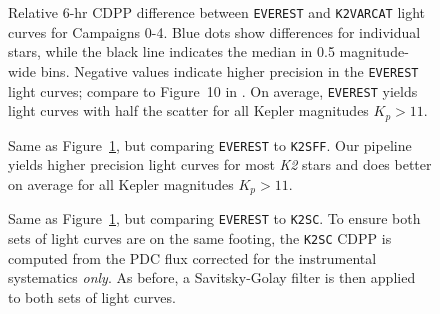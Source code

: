 \documentclass[]{emulateapj}
\begin{document}
\begin{figure}[h]
  \begin{center}
       \caption{Relative 6-hr CDPP difference between \texttt{EVEREST}
                and \texttt{K2VARCAT} light curves for Campaigns 0-4. Blue dots
                show differences for individual stars, while the black line
                indicates the median in 0.5 magnitude-wide bins. Negative
                values indicate higher precision in the \texttt{EVEREST}
                light curves; compare to Figure~10 in \cite{AIG16}. On average, \texttt{EVEREST} yields
                light curves with half the scatter for all Kepler magnitudes $K_p > 11$.}
     \label{fig:comparison_k2varcat}
  \end{center}
\end{figure}
\begin{figure}[h]
  \begin{center}
       \caption{Same as Figure~\ref{fig:comparison_k2varcat}, but comparing 
                \texttt{EVEREST} to \texttt{K2SFF}. Our pipeline yields higher
                precision light curves for most \emph{K2} stars and does
                better on average for all Kepler magnitudes $K_p > 11$.}
     \label{fig:comparison_k2sff}
  \end{center}
\end{figure}
\begin{figure}[h]
  \begin{center}
       \caption{Same as Figure~\ref{fig:comparison_k2varcat}, but comparing 
                \texttt{EVEREST} to \texttt{K2SC}. To ensure both sets of light curves
                are on the same footing, the \texttt{K2SC} CDPP
                is computed from the PDC flux corrected for the instrumental 
                systematics \emph{only}. As before, a Savitsky-Golay filter
                is then applied to both sets of light curves.}
     \label{fig:comparison_k2sc}
  \end{center}
\end{figure}
\end{document}
